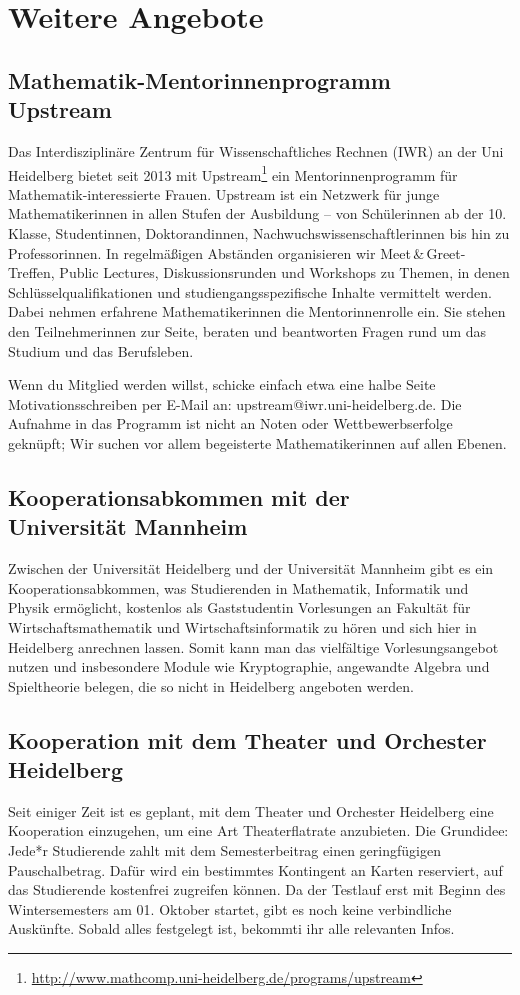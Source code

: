 \section{Weitere Angebote}

\subsection{Mathematik-Mentorinnenprogramm \\Upstream}
Das Interdisziplinäre Zentrum für Wissenschaftliches Rechnen (IWR) an der Uni Heidelberg bietet seit 2013 mit Upstream\footnote{\url{http://www.mathcomp.uni-heidelberg.de/programs/upstream}} ein Mentorinnenprogramm für Mathematik-interessierte Frauen. Upstream ist ein Netzwerk für junge Mathematikerinnen in allen Stufen der Ausbildung -- von Schülerinnen ab der 10. Klasse, Studentinnen, Doktorandinnen, Nachwuchswissenschaftlerinnen bis hin zu Professorinnen. In regelmäßigen Abständen organisieren wir Meet\,\&\,Greet-Treffen, Public Lectures, Diskussionsrunden und Workshops zu Themen, in denen Schlüsselqualifikationen und studiengangsspezifische Inhalte vermittelt werden. Dabei nehmen erfahrene Mathematikerinnen die Mentorinnenrolle ein. Sie stehen den Teilnehmerinnen zur Seite, beraten und beantworten Fragen rund um das Studium und das Berufsleben.

Wenn du Mitglied werden willst, schicke einfach etwa eine halbe Seite Motivationsschreiben per E-Mail an: upstream@iwr.uni-heidelberg.de. Die Aufnahme in das Programm ist nicht an Noten oder Wettbewerbserfolge geknüpft; Wir suchen vor allem begeisterte Mathematikerinnen auf allen Ebenen.

\subsection{Kooperationsabkommen mit der \\Universität Mannheim}
Zwischen der Universität Heidelberg und der Universität Mannheim gibt es ein Kooperationsabkommen, was Studierenden in Mathematik, Informatik und Physik ermöglicht, kostenlos als Gaststudentin Vorlesungen an Fakultät für Wirtschaftsmathematik und Wirtschaftsinformatik zu hören und sich hier in Heidelberg anrechnen lassen. 
Somit kann man das vielfältige Vorlesungsangebot nutzen und insbesondere Module wie Kryptographie, angewandte Algebra und Spieltheorie belegen, die so nicht in Heidelberg angeboten werden.

\subsection{Kooperation mit dem Theater und Orchester Heidelberg}
Seit einiger Zeit ist es geplant, mit dem Theater und Orchester Heidelberg eine Kooperation einzugehen, um eine Art Theaterflatrate anzubieten. Die Grundidee: Jede*r Studierende zahlt mit dem Semesterbeitrag einen geringfügigen Pauschalbetrag. Dafür wird ein bestimmtes Kontingent an Karten reserviert, auf das Studierende kostenfrei zugreifen können. 
Da der Testlauf erst mit Beginn des Wintersemesters am 01. Oktober startet, gibt es noch keine verbindliche Auskünfte. Sobald alles festgelegt ist, bekommti ihr alle relevanten Infos.

